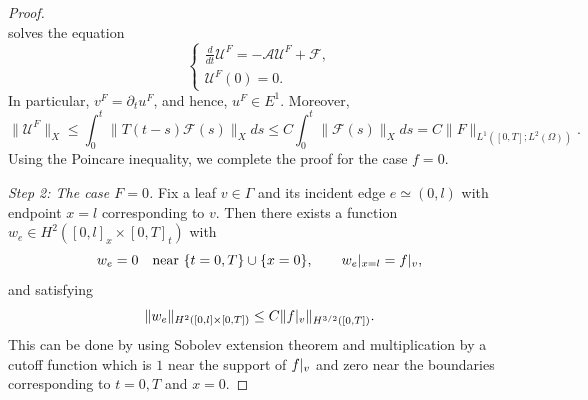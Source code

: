 \documentclass[11pt]{amsart}
\theoremstyle{definition}
\theoremstyle{plain}
\numberwithin{equation}{section}
\begin{document}
\begin{proof}
\begin{equation*}
    \end{equation*}
    solves the equation 
    \begin{equation*}
    \begin{cases}
        \frac{d}{dt} \mathcal{U}^F = - \mathcal{A} \mathcal{U}^F + \mathcal{F},\\
        \mathcal{U}^F(0) = 0.
    \end{cases}
    \end{equation*}
    In particular, $v^F = \partial_t u^F$, and hence, $u^F \in E^1$. Moreover,
    \begin{equation}\label{est_uF}
        \|\mathcal{U}^F\|_{X} \leq 
        \int_0^t \|T(t - s) \mathcal{F}(s)\|_Xds\leq 
        C \int_0^t \|\mathcal{F}(s)\|_Xds = C\|F\|_{L^1([0,T]; L^2(\Omega))}.
    \end{equation}
    Using the Poincare inequality, we complete the proof for the case $f=0$. 

    \emph{Step 2: The case $F=0$.}
    Fix a leaf $v\in\Gamma$ and its incident edge $e\simeq(0,l)$ with endpoint $x=l$ corresponding to $v$. Then there exists a function $w_e\in H^{2}([0,l]_x\times [0,T]_t)$ with
    \begin{equation*}
        w_e = 0 \quad \text{near } \{t=0,T\}\cup \{x=0\}, 
        \qquad 
        w_e\arrowvert_{x=l} = f\arrowvert_v,
    \end{equation*}
    and satisfying 
    \begin{equation}\label{est_w_f}
        \|w_e\|_{H^2([0,l]\times [0,T])} \leq C \|f\arrowvert_v\|_{H^{3/2}([0,T])}.
    \end{equation}
    This can be done by using Sobolev extension theorem and multiplication by a cutoff function which is $1$ near the support of $f\arrowvert_v$ and zero near the boundaries corresponding to $t=0,T$ and $x=0$. 


\end{proof}
\end{document}

